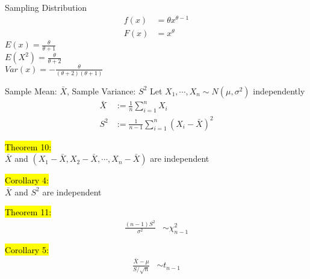 \documentclass[a4paper,12pt,landscape]{article}
\begin{document}
\begin{multicols}{3}
\begin{section}{Sampling Distribution}
        \begin{align*}
            f(x) &= \theta x^{\theta-1}\\
            F(x) &= x^{\theta}
        \end{align*}
        $E(x) = \frac{\theta}{\theta+1}$\\
        $E(X^2) = \frac{\theta}{\theta+2}$\\
        $Var(x) = -\frac{\theta}{(\theta+2)(\theta+1)}$

        \begin{subsection}{Sample Mean: $\bar X$, Sample Variance: $S^2$}
            Let $X_1, \cdots, X_n \sim N(\mu, \sigma^2)$ independently\\
            \begin{align*}
                \bar X &:= \frac{1}{n}\sum_{i=1}^nX_i\\
                S^2 &:= \frac{1}{n-1}\sum_{i=1}^n(X_i-\bar X)^2
            \end{align*}
            
            \hl{Theorem 10:}\\
            $\bar X$ and $(X_1 - \bar X, X_2 - \bar X, \cdots, X_n - \bar X)$ are independent

            \hl{Corollary 4:}\\
            $\bar X$ and $S^2$ are independent

            \hl{Theorem 11:}\\
            \begin{align*}
                \frac{(n-1)S^2}{\sigma^2}&\sim\chi_{n-1}^2
            \end{align*}

            \hl{Corollary 5:}
            \begin{align*}
                \frac{\bar X - \mu}{S / \sqrt{n}}&\sim t_{n-1}
            \end{align*}
        \end{subsection}
    \end{section}
    

\end{multicols}
\end{document}
